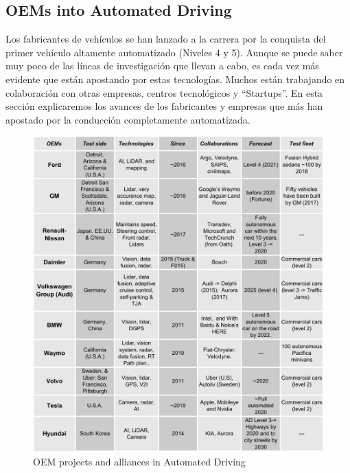 \subsection{OEMs into Automated Driving}

Los fabricantes de vehículos se han lanzado a la carrera por la conquista del 
primer vehículo altamente automatizado (Niveles 4 y 5). Aunque se puede saber 
muy poco de las líneas de investigación que llevan a cabo, es cada vez más 
evidente que están apostando por estas tecnologías. Muchos están trabajando en 
colaboración con otras empresas, centros tecnológicos y “Startups”. En esta 
sección explicaremos los avances de los fabricantes y empresas que más han 
apostado por la conducción completamente automatizada.

\begin{figure}[p]
    \centering
    \includegraphics[width=1.00\textwidth]{"img/OEM_jp_trim"}
    \caption{OEM projects and alliances in Automated Driving}
    \label{fig:oem-ad}
\end{figure}

